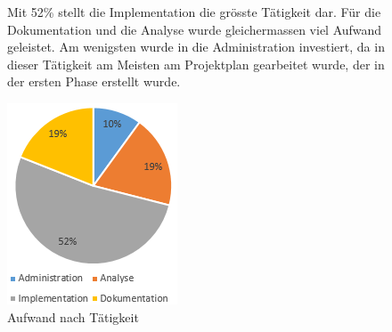 \begin{figure}[htbp]
	\begin{minipage}{0.5\textwidth} 
Mit 52\% stellt die Implementation die grösste Tätigkeit dar. Für die Dokumentation und die Analyse wurde gleichermassen viel Aufwand geleistet. Am wenigsten wurde in die Administration investiert, da in dieser Tätigkeit am Meisten am Projektplan gearbeitet wurde, der in der ersten Phase erstellt wurde.
	\end{minipage}
	\hfill
	\begin{minipage}{0.45\textwidth}
		\includegraphics[scale=0.65]{appendix/img/aufwand3}
		\caption{Aufwand nach Tätigkeit}
		\label{fig:aufwand3}
	\end{minipage}
\end{figure}